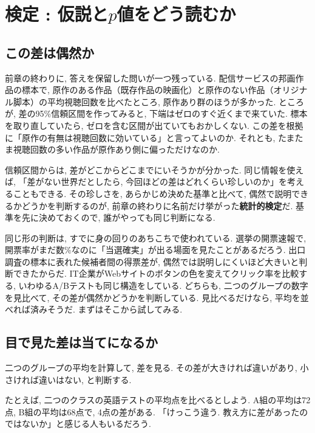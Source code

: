 \section{検定 : 仮説と\texorpdfstring{$p$}{p}値をどう読むか}

  \subsection{この差は偶然か}

    前章の終わりに, 答えを保留した問いが一つ残っている.
    配信サービスの邦画作品の標本で, 原作のある作品（既存作品の映画化）と原作のない作品（オリジナル脚本）の平均視聴回数を比べたところ, 原作あり群のほうが多かった.
    ところが, 差の95\%信頼区間を作ってみると, 下端はゼロのすぐ近くまで来ていた.
    標本を取り直していたら, ゼロを含む区間が出ていてもおかしくない.
    この差を根拠に「原作の有無は視聴回数に効いている」と言ってよいのか.
    それとも, たまたま視聴回数の多い作品が原作あり側に偏っただけなのか.

    信頼区間からは, 差がどこからどこまでにいそうかが分かった.
    同じ情報を使えば, 「差がない世界だとしたら, 今回ほどの差はどれくらい珍しいのか」を考えることもできる.
    その珍しさを, あらかじめ決めた基準と比べて, 偶然で説明できるかどうかを判断するのが, 前章の終わりに名前だけ挙がった\textbf{統計的検定}だ.
    基準を先に決めておくので, 誰がやっても同じ判断になる.

    同じ形の判断は, すでに身の回りのあちこちで使われている.
    選挙の開票速報で, 開票率がまだ数\%なのに「当選確実」が出る場面を見たことがあるだろう.
    出口調査の標本に表れた候補者間の得票差が, 偶然では説明しにくいほど大きいと判断できたからだ.
    IT企業がWebサイトのボタンの色を変えてクリック率を比較する, いわゆるA/Bテストも同じ構造をしている.
    どちらも, 二つのグループの数字を見比べて, その差が偶然かどうかを判断している.
    見比べるだけなら, 平均を並べれば済みそうだ.
    まずはそこから試してみる.


  \subsection{目で見た差は当てになるか}

    二つのグループの平均を計算して, 差を見る.
    その差が大きければ違いがあり, 小さければ違いはない, と判断する.

    たとえば, 二つのクラスの英語テストの平均点を比べるとしよう.
    A組の平均は72点, B組の平均は68点で, 4点の差がある.
    「けっこう違う. 教え方に差があったのではないか」と感じる人もいるだろう.

